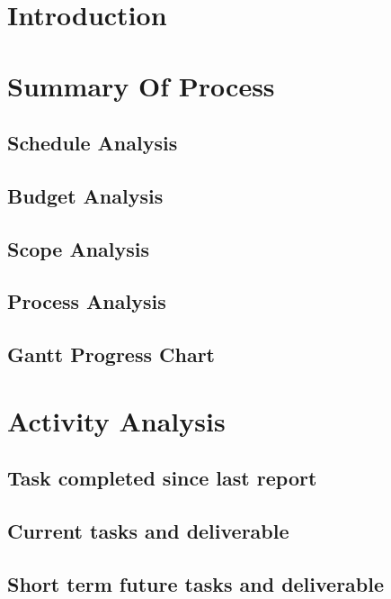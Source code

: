 \documentclass[a4paper, 12pt, onepage]{article}
\begin{document}
      \setcounter{page}{2}
      \cleardoublepage
      {
        \setlength{\parskip}{0em}
        \renewcommand\contentsname{Table of Contents}
        \tableofcontents {}
      }


      \cleardoublepage
      \section{Introduction}

      \cleardoublepage
      \section{Summary Of Process}
      \subsection{Schedule Analysis}
      \subsection{Budget Analysis}
      \subsection{Scope Analysis}
      \subsection{Process Analysis}
      \subsection{Gantt Progress Chart}

      \cleardoublepage
      \section{Activity Analysis}
      \subsection{Task completed since last report}
      \subsection{Current tasks and deliverable}
      \subsection{Short term future tasks and deliverable}
\end{document}
